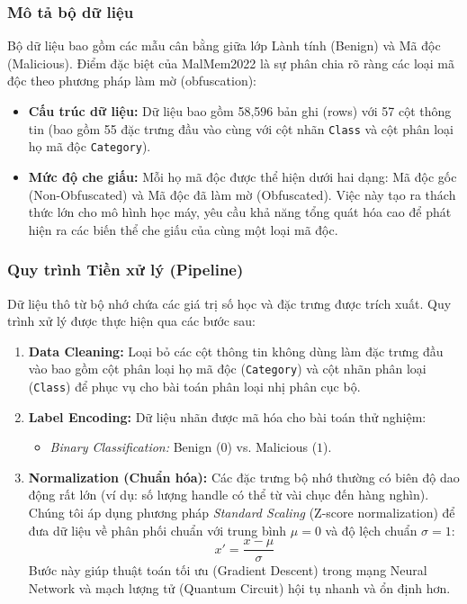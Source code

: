 \subsubsection{Mô tả bộ dữ liệu}
Bộ dữ liệu bao gồm các mẫu cân bằng giữa lớp Lành tính (Benign) và Mã độc (Malicious). Điểm đặc biệt của MalMem2022 là sự phân chia rõ ràng các loại mã độc theo phương pháp làm mờ (obfuscation):
\begin{itemize}
    \item \textbf{Cấu trúc dữ liệu:} Dữ liệu bao gồm 58,596 bản ghi (rows) với 57 cột thông tin (bao gồm 55 đặc trưng đầu vào cùng với cột nhãn \texttt{Class} và cột phân loại họ mã độc \texttt{Category}).
    \item \textbf{Mức độ che giấu:} Mỗi họ mã độc được thể hiện dưới hai dạng: Mã độc gốc (Non-Obfuscated) và Mã độc đã làm mờ (Obfuscated). Việc này tạo ra thách thức lớn cho mô hình học máy, yêu cầu khả năng tổng quát hóa cao để phát hiện ra các biến thể che giấu của cùng một loại mã độc.
\end{itemize}

\subsubsection{Quy trình Tiền xử lý (Pipeline)}
Dữ liệu thô từ bộ nhớ chứa các giá trị số học và đặc trưng được trích xuất. Quy trình xử lý được thực hiện qua các bước sau:

\begin{enumerate}
    \item \textbf{Data Cleaning:} Loại bỏ các cột thông tin không dùng làm đặc trưng đầu vào bao gồm cột phân loại họ mã độc (\texttt{Category}) và cột nhãn phân loại (\texttt{Class}) để phục vụ cho bài toán phân loại nhị phân cục bộ.
    \item \textbf{Label Encoding:}
    Dữ liệu nhãn được mã hóa cho bài toán thử nghiệm:
    \begin{itemize}
        \item \textit{Binary Classification:} Benign ($0$) vs. Malicious ($1$).
    \end{itemize}
    \item \textbf{Normalization (Chuẩn hóa):}
    Các đặc trưng bộ nhớ thường có biên độ dao động rất lớn (ví dụ: số lượng handle có thể từ vài chục đến hàng nghìn). Chúng tôi áp dụng phương pháp \textit{Standard Scaling} (Z-score normalization) để đưa dữ liệu về phân phối chuẩn với trung bình $\mu = 0$ và độ lệch chuẩn $\sigma = 1$:
    $$x' = \frac{x - \mu}{\sigma}$$
    Bước này giúp thuật toán tối ưu (Gradient Descent) trong mạng Neural Network và mạch lượng tử (Quantum Circuit) hội tụ nhanh và ổn định hơn.
\end{enumerate}

